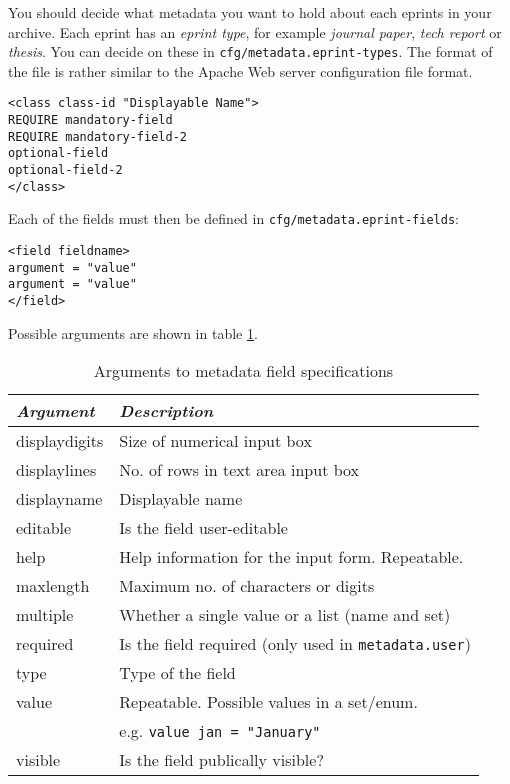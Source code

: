 You should decide what metadata you want to hold about each eprints in your archive. Each eprint has an \emph{eprint type}, for example \emph{journal paper}, \emph{tech report} or \emph{thesis}. You can decide on these in {\tt cfg/metadata.eprint-types}. The format of the file is rather similar to the Apache Web server configuration file format.

\begin{verbatim}
<class class-id "Displayable Name">
REQUIRE mandatory-field
REQUIRE mandatory-field-2
optional-field
optional-field-2
</class>
\end{verbatim}

Each of the fields must then be defined in {\tt cfg/metadata.eprint-fields}:

\begin{verbatim}
<field fieldname>
argument = "value"
argument = "value"
</field>
\end{verbatim}

Possible arguments are shown in table \ref{install_meta_args}.

\begin{table}
\begin{center}
\begin{tabular}{|l|l|}
\hline
\emph{Argument} & \emph{Description}                                       \\
\hline
displaydigits   & Size of numerical input box                              \\
displaylines    & No. of rows in text area input box                       \\
displayname     & Displayable name                                         \\
editable        & Is the field user-editable                               \\
help            & Help information for the input form. Repeatable.         \\
maxlength       & Maximum no. of characters or digits                      \\
multiple        & Whether a single value or a list (name and set)          \\
required        & Is the field required (only used in {\tt metadata.user}) \\
type            & Type of the field                                        \\
value           & Repeatable. Possible values in a set/enum.               \\
                & e.g. {\tt value jan = "January"}                         \\
visible         & Is the field publically visible?                         \\
\hline
\end{tabular}
\caption{\label{install_meta_args} Arguments to metadata field specifications}
\end{center}
\end{table}

